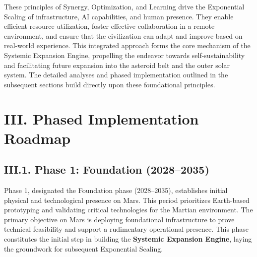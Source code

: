 \documentclass[fontsize=10pt, oneside, DIV=calc]{scrartcl}
\begin{document}
\medskip

\noindent
These principles of Synergy, Optimization, and Learning drive the Exponential Scaling of infrastructure, AI capabilities, and human presence. They enable efficient resource utilization, foster effective collaboration in a remote environment, and ensure that the civilization can adapt and improve based on real-world experience. This integrated approach forms the core mechanism of the Systemic Expansion Engine, propelling the endeavor towards self-sustainability and facilitating future expansion into the asteroid belt and the outer solar system. The detailed analyses and phased implementation outlined in the subsequent sections build directly upon these foundational principles.



            
\section*{III. Phased Implementation Roadmap}



\subsection*{III.1. Phase 1: Foundation (2028–2035)}



\medskip

\noindent
Phase 1, designated the Foundation phase (2028--2035), establishes initial physical and technological presence on Mars. This period prioritizes Earth-based prototyping and validating critical technologies for the Martian environment. The primary objective on Mars is deploying foundational infrastructure to prove technical feasibility and support a rudimentary operational presence. This phase constitutes the initial step in building the \textbf{Systemic Expansion Engine}, laying the groundwork for subsequent Exponential Scaling.

\medskip
\end{document}
